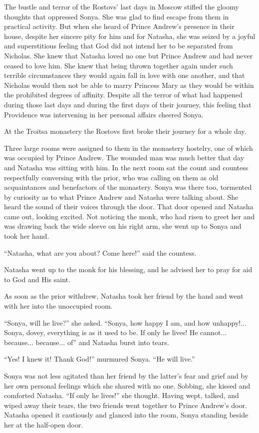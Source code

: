 The bustle and terror of the Rostovs' last days in Moscow stifled
the gloomy thoughts that oppressed Sonya. She was glad to find
escape from them in practical activity. But when she heard of
Prince Andrew's presence in their house, despite her sincere pity
for him and for Natasha, she was seized by a joyful and
superstitious feeling that God did not intend her to be separated
from Nicholas. She knew that Natasha loved no one but Prince
Andrew and had never ceased to love him. She knew that being
thrown together again under such terrible circumstances they
would again fall in love with one another, and that Nicholas
would then not be able to marry Princess Mary as they would be
within the prohibited degrees of affinity. Despite all the terror
of what had happened during those last days and during the first
days of their journey, this feeling that Providence was
intervening in her personal affairs cheered Sonya.

At the Troitsa monastery the Rostovs first broke their journey
for a whole day.

Three large rooms were assigned to them in the monastery
hostelry, one of which was occupied by Prince Andrew. The wounded
man was much better that day and Natasha was sitting with him. In
the next room sat the count and countess respectfully conversing
with the prior, who was calling on them as old acquaintances and
benefactors of the monastery.  Sonya was there too, tormented by
curiosity as to what Prince Andrew and Natasha were talking
about. She heard the sound of their voices through the door. That
door opened and Natasha came out, looking excited. Not noticing
the monk, who had risen to greet her and was drawing back the
wide sleeve on his right arm, she went up to Sonya and took her
hand.

``Natasha, what are you about? Come here!'' said the countess.

Natasha went up to the monk for his blessing, and he advised her
to pray for aid to God and His saint.

As soon as the prior withdrew, Natasha took her friend by the
hand and went with her into the unoccupied room.

``Sonya, will he live?'' she asked. ``Sonya, how happy I am, and
how unhappy!... Sonya, dovey, everything is as it used to be. If
only he lives! He cannot... because... because... of'' and
Natasha burst into tears.

``Yes! I knew it! Thank God!'' murmured Sonya. ``He will live.''

Sonya was not less agitated than her friend by the latter's fear
and grief and by her own personal feelings which she shared with
no one.  Sobbing, she kissed and comforted Natasha. ``If only he
lives!'' she thought. Having wept, talked, and wiped away their
tears, the two friends went together to Prince Andrew's
door. Natasha opened it cautiously and glanced into the room,
Sonya standing beside her at the half-open door.

